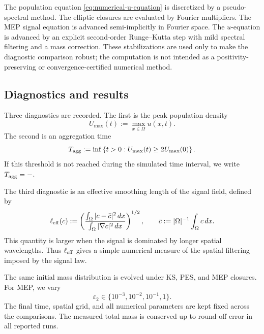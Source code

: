 \documentclass[pdflatex,sn-mathphys-num]{sn-jnl}%
\theoremstyle{thmstyleone}
\theoremstyle{thmstyletwo}
\theoremstyle{thmstylethree}
\begin{document}
The population equation \eqref{eq:numerical-u-equation} is discretized by a
pseudo-spectral method.  The elliptic closures are evaluated by Fourier
multipliers.  The MEP signal equation is advanced semi-implicitly in Fourier
space.  The \(u\)-equation is advanced by an explicit second-order Runge--Kutta
step with mild spectral filtering and a mass correction.  These stabilizations
are used only to make the diagnostic comparison robust; the computation is not
intended as a positivity-preserving or convergence-certified numerical method.

\subsection{Diagnostics and results}

Three diagnostics are recorded.  The first is the peak population density
\[
        U_{\max}(t):=\max_{x\in\Omega}u(x,t).
\]
The second is an aggregation time
\[
        T_{\rm agg}
        :=
        \inf\left\{
        t>0:
        U_{\max}(t)\ge 2U_{\max}(0)
        \right\}.
\]
If this threshold is not reached during the simulated time interval, we write
\(T_{\rm agg}=-\).

The third diagnostic is an effective smoothing length of the signal field,
defined by
\begin{equation}
\label{eq:effective-smoothing-length}
        \ell_{\rm eff}(c)
        :=
        \left(
        \frac{\int_\Omega |c-\bar c|^2\,dx}
             {\int_\Omega |\nabla c|^2\,dx}
        \right)^{1/2},
        \qquad
        \bar c:=|\Omega|^{-1}\int_\Omega c\,dx.
\end{equation}
This quantity is larger when the signal is dominated by longer spatial
wavelengths.  Thus \(\ell_{\rm eff}\) gives a simple numerical measure of the
spatial filtering imposed by the signal law.


The same initial mass distribution is evolved under KS, PES, and MEP closures.
For MEP, we vary
\[
        \varepsilon_2\in\{10^{-3},10^{-2},10^{-1},1\}.
\]
The final time, spatial grid, and all numerical parameters are kept fixed
across the comparisons.  The measured total mass is conserved up to round-off
error in all reported runs.
\end{document}
